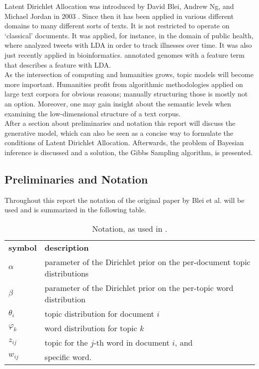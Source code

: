 \documentclass[a4paper,ngerman, english]{atseminar}
\begin{document}
Latent Dirichlet Allocation was introduced by David Blei, Andrew Ng, and Michael Jordan in 2003 \cite{blei2003latent}.
Since then it has been applied in various different domains to many different sorts of texts. 
It is not restricted to operate on `classical' documents. It was applied, for instance, in the domain of public health, where
\cite{paul2011you} analyzed tweets with LDA in order to track illnesses over time. It was also 
just recently applied in bioinformatics. \cite{pinoli2014latent} annotated genomes with a feature term 
that describes a feature with LDA.
\\
As the intersection of computing and humanities grows, topic models will become more important.
Humanities profit from algorithmic methodologies applied on large text corpora for obvious reasons;
manually structuring those is mostly not an option. Moreover, one may gain insight about the semantic levels when
examining the low-dimensional structure of a text corpus.\\
After a section about preliminaries and notation this report will discuss the generative model, 
which can also be seen as a concise way to formulate the conditions of Latent Dirichlet Allocation.
Afterwards, the problem of Bayesian inference is discussed and a solution, the Gibbs Sampling algorithm, is presented.


\subsection{Preliminaries and Notation}

Throughout this report the notation of the original paper by Blei et al. will be used and 
is summarized in the following table.

\begin{table}[h]
\centering
\caption{Notation, as used in \cite{blei2003latent}.}
\begin{tabular}{l l}
\textbf{symbol} & \textbf{description} \\
 $\alpha$       & parameter of the Dirichlet prior on the per-document topic distributions \\
 $\beta$        & parameter of the Dirichlet prior on the per-topic word distribution \\ 
 $\theta_i$     & topic distribution for document $i$ \\
 $\varphi_k$   & word distribution for topic $k$ \\
 $z_{ij}$         & topic for the $j$-th word in document $i$, and \\
 $w_{ij}$        & specific word.
  
\end{tabular}
\label{XY:tab:interesting}
\end{table}
\end{document}
